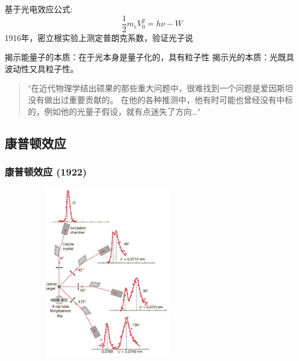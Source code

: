 \begin{frame} 
    基于光电效应公式:
$$
\frac{1}{2}m_eV_0^2=h\nu-W
$$
1916年，密立根实验上测定普朗克系数，验证光子说\\
\color{deepred}{1923年诺贝尔物理学奖} 
\end{frame}

\begin{frame} 
    \begin{tcolorbox4}[光量子假说的意义]
        \begin{itemize}
            \Item  揭示能量子的本质：在于光本身是量子化的，具有粒子性
            \Item  揭示光的本质：光既具波动性又具粒子性。
        \end{itemize}
    \end{tcolorbox4}
    \begin{quotation}
        "在近代物理学结出硕果的那些重大问题中，很难找到一个问题是爱因斯坦没有做出过重要贡献的。
        在他的各种推测中，他有时可能也曾经没有中标的，例如他的光量子假设，就有点迷失了方向\dots"  \\
    \end{quotation}
\end{frame}

\subsection{康普顿效应}

\begin{frame}   
    \frametitle{康普顿效应 (1922)}
    \begin{center}
        \includegraphics[width=0.7\textwidth, height=3in]{figs/comptonscattering.png}
    \end{center}  
\end{frame}

